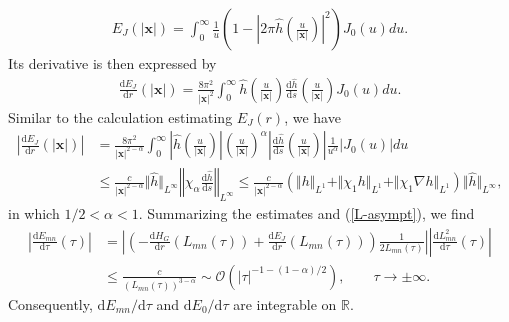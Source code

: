 \documentclass{article}
\theoremstyle{definition}
\begin{document}
\begin{align*}
E_J(\vert{\bm x}\vert) = \int_0^\infty \frac{1}{u} \left( 1 - \left\vert 2\pi\widehat{h}\left( \frac{u}{\vert{\bm x}\vert} \right) \right\vert^2 \right) J_0 \left( u \right) du.
\end{align*}
Its derivative is then expressed by
\begin{align*}
\frac{\mbox{d}E_J}{\mbox{d}r}(\vert{\bm x}\vert) = \frac{8 \pi^2}{\vert{\bm x}\vert^2} \int_0^\infty \widehat{h}\left( \frac{u}{\vert{\bm x}\vert} \right) \frac{\mbox{d}\widehat{h}}{\mbox{d}s}\left( \frac{u}{\vert{\bm x}\vert} \right) J_0 \left( u \right) du.
\end{align*}
Similar to the calculation estimating $E_J(r)$, we have
\begin{align*}
\left\vert \frac{\mbox{d}E_J}{\mbox{d}r}(\vert{\bm x}\vert) \right\vert &= \frac{8 \pi^2}{\vert{\bm x}\vert^{2-\alpha}} \int_0^\infty  \left\vert \widehat{h}\left( \frac{u}{\vert{\bm x}\vert} \right) \right\vert \left( \frac{u}{\vert{\bm x}\vert} \right)^\alpha \left\vert \frac{\mbox{d}\widehat{h}}{\mbox{d}s}\left( \frac{u}{\vert{\bm x}\vert} \right) \right\vert \frac{1}{u^\alpha} \left\vert J_0 \left( u \right) \right\vert du \\
&\leq \frac{c}{\vert{\bm x}\vert^{2 - \alpha}} \Vert \widehat{h} \Vert_{L^\infty} \left\Vert \chi_\alpha \frac{\mbox{d}\widehat{h}}{\mbox{d}s} \right\Vert_{L^\infty} \leq \frac{c}{\vert{\bm x}\vert^{2 - \alpha}} \left( \Vert h \Vert_{L^1} + \Vert \chi_1 h \Vert_{L^1} + \Vert \chi_1 \nabla h \Vert_{L^1} \right) \Vert \widehat{h} \Vert_{L^\infty}, 
\end{align*}
in which $1 /2 < \alpha < 1$. Summarizing the estimates and (\ref{L-asympt}), we find 
\begin{align*}
\left\vert \frac{\mbox{d} E_{mn}}{\mbox{d}\tau}(\tau) \right\vert &= \left\vert \left(- \frac{\mbox{d} H_G}{\mbox{d}r}(L_{mn}(\tau)) + \frac{\mbox{d} E_J}{\mbox{d}r}(L_{mn}(\tau)) \right)\frac{1}{2 L_{mn}(\tau)} \right\vert \left\vert \frac{\mbox{d} L_{mn}^2}{\mbox{d} \tau}(\tau)\right\vert \\
& \leq \frac{c}{(L_{mn}(\tau))^{3 - \alpha}} \sim \mathcal{O}(\vert\tau\vert^{- 1 - (1 - \alpha) /2 }), \qquad \tau \rightarrow \pm \infty.
\end{align*}
Consequently,  $\mbox{d} E_{mn} / \mbox{d}\tau$ and $\mbox{d} E_0 / \mbox{d}\tau$ are integrable on $\mathbb{R}$.
\end{document}
